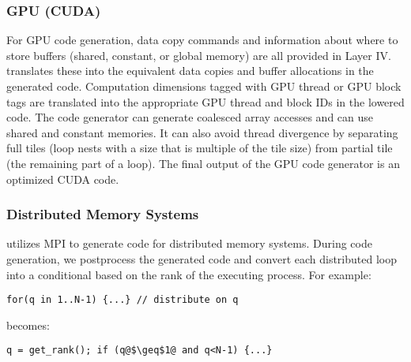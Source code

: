 \subsubsection{GPU (CUDA)}
For GPU code generation, data copy commands and information about where to store buffers (shared, constant, or global memory) are all provided in Layer IV.  \framework{} translates these into the equivalent data copies and buffer allocations in the generated code.  Computation dimensions tagged with GPU thread or GPU block tags are translated into the appropriate GPU thread and block IDs in the lowered code.  The \framework{} code generator can generate coalesced array accesses and can use shared and constant memories. It can also avoid thread divergence by separating full tiles (loop nests with a size that is multiple of the tile size) from partial tile (the remaining part of a loop).
The final output of the GPU code generator is an optimized CUDA code.


\subsubsection{Distributed Memory Systems}

\framework{} utilizes MPI to generate code for distributed memory systems.  During code generation, we postprocess the generated code and convert each distributed loop into a conditional based on the rank of the executing process. For example:
\vspace{-0.15cm}
\begin{lstlisting}[numbers=none]
for(q in 1..N-1) {...} // distribute on q
\end{lstlisting}
\vspace{-0.15cm}
becomes:
\vspace{-0.15cm}
\begin{lstlisting}[escapechar=@,numbers=none]
q = get_rank(); if (q@$\geq$1@ and q<N-1) {...}
\end{lstlisting}



